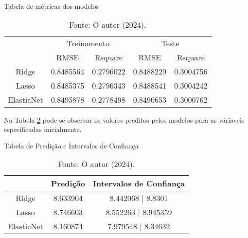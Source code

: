 \begin{table}[H]
\centering
\caption{Tabela de métricas dos modelos}
\begin{tabular}{c|c|c|c|c||}      
\cline{2-5}
    & \multicolumn{2}{c|}{Treinamento} & \multicolumn{2}{c||}{Teste}\\
\cline{2-5}
    & RMSE & Rsquare & RMSE & Rsquare\\
\cline{1-5}
\multicolumn{1}{||c|}{Ridge} & \cellcolor[HTML]{FFF8B8} 0.8485564 & \cellcolor[HTML]{FFF8B8} 0.2796022 & \cellcolor[HTML]{CAF2C2} 0.8488229 & \cellcolor[HTML]{CAF2C2} 0.3004756 \\
\cline{1-5}
\multicolumn{1}{||c|}{Lasso} & \cellcolor[HTML]{CAF2C2} 0.8485375 & \cellcolor[HTML]{CAF2C2} 0.2796343 & \cellcolor[HTML]{FFF8B8} 0.8488541 & \cellcolor[HTML]{FFF8B8} 0.3004242 \\
\cline{1-5}
\multicolumn{1}{||c|}{ElasticNet} & \cellcolor[HTML]{FFD6C9} 0.8495878 & \cellcolor[HTML]{FFD6C9} 0.2778498 & \cellcolor[HTML]{FFD6C9} 0.8490653 & \cellcolor[HTML]{FFD6C9} 0.3000762 \\                
\hline
\end{tabular}
\caption*{Fonte: O autor (2024).}
\label{tab:metricas}
\end{table}

Na Tabela \ref{tab:predicao} pode-se observar os valores preditos pelos modelos para as váriaveis especificadas inicialmente.

\begin{table}[H]
\centering
\caption{Tabela de Predição e Intervalos de Confiança}
\begin{tabular}{c|c|c||}       
\cline{2-3}
           & \multicolumn{1}{c|}{Predição} & Intervalos de Confiança \\
\hline
\multicolumn{1}{||c|}{Ridge}      & 8.633904 & 8.442068 | 8.8301     \\
\hline
\multicolumn{1}{||c|}{Lasso}      & 8.746603 & 8.552263 | 8.945359     \\
\hline
\multicolumn{1}{||c|}{ElasticNet} & 8.160874 & 7.979548 | 8.34632    \\
\hline
\end{tabular}
\caption*{Fonte: O autor (2024).}
\label{tab:predicao}
\end{table}